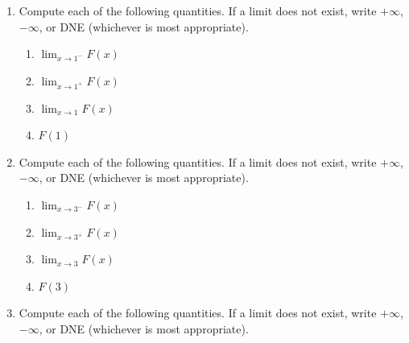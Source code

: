 \documentclass[12pt]{article}
\newif\ifans
\begin{document}
\begin{enumerate}

\item Compute each of the following quantities.  If a limit does not exist, write $+\infty$, $-\infty$, or DNE (whichever is most appropriate). 

\begin{enumerate}

\item $\displaystyle \lim_{x \rightarrow 1^{-}}{F(x)}$

\ifans{\fbox{1}} \fi

\item $\displaystyle \lim_{x \rightarrow 1^{+}}{F(x)}$

\ifans{\fbox{1}} \fi

\item $\displaystyle \lim_{x \rightarrow 1}{F(x)}$

\ifans{\fbox{1}} \fi

\item $F(1)$

\ifans{\fbox{$-1$}} \fi

\end{enumerate}

\newpage

\item Compute each of the following quantities.  If a limit does not exist, write $+\infty$, $-\infty$, or DNE (whichever is most appropriate). 

\begin{enumerate}

\item $\displaystyle \lim_{x \rightarrow 3^{-}}{F(x)}$

\ifans{\fbox{$-2$}} \fi

\item $\displaystyle \lim_{x \rightarrow 3^{+}}{F(x)}$

\ifans{\fbox{$1$}} \fi

\item $\displaystyle \lim_{x \rightarrow 3}{F(x)}$

\ifans{\fbox{DNE because $\displaystyle \lim_{x \rightarrow 3^{-}}{F(x)} \neq \lim_{x \rightarrow 3^{+}}{F(x)}$}} \fi

\item $F(3)$

\ifans{\fbox{$-2$}} \fi

\end{enumerate}

\item Compute each of the following quantities.  If a limit does not exist, write $+\infty$, $-\infty$, or DNE (whichever is most appropriate). 


\end{enumerate}
\end{document}
